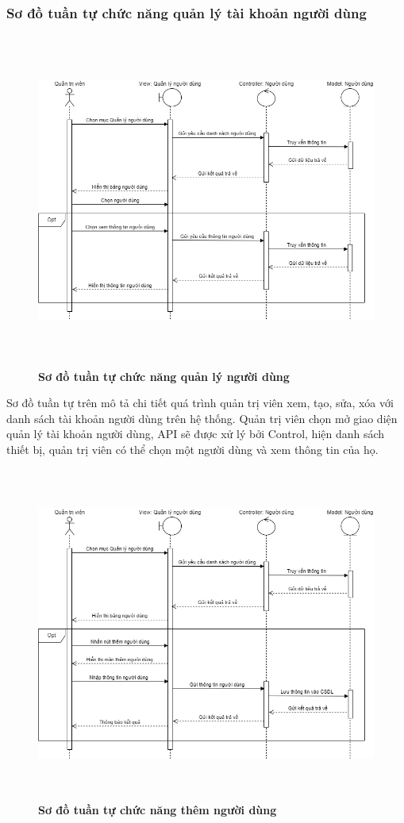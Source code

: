 \subsubsection{Sơ đồ tuần tự chức năng quản lý tài khoản người dùng}
\begin{figure}[H]
  \centering
  \includegraphics[width=14cm,height=11cm]{Images/sequence/sequence_manage_user.png}
  \caption[Sơ đồ tuần tự chức năng quản lý người dùng]{\bfseries \fontsize{12pt}{0pt}
  \selectfont Sơ đồ tuần tự chức năng quản lý người dùng}
  \label{sequence_manage_user} %
\end{figure}
Sơ đồ tuần tự trên mô tả chi tiết quá trình quản trị viên xem, tạo, sửa, xóa với danh sách tài khoản người dùng trên hệ thống. Quản trị viên chọn mở giao diện
quản lý tài khoản người dùng, API sẽ được xử lý bởi Control, hiện danh sách thiết bị, quản trị viên có thể chọn một người dùng và xem thông tin của họ. 
\begin{figure}[H]
  \centering
  \includegraphics[width=14cm,height=11cm]{Images/sequence/sequence_manage_add_user.png}
  \caption[Sơ đồ tuần tự chức năng thêm người dùng]{\bfseries \fontsize{12pt}{0pt}
  \selectfont Sơ đồ tuần tự chức năng thêm người dùng}
  \label{sequence_manage_add_user} %
\end{figure}
